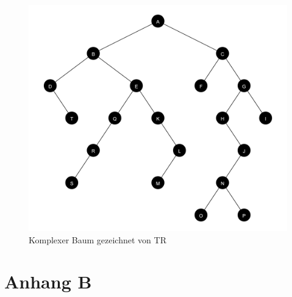 \begin{figure}[ht]
    \centering
    \includegraphics[scale = 0.11]{abbildungen/komplex_a3}
    \caption{Komplexer Baum gezeichnet von TR}
\end{figure}

\chapter{Anhang B}
\label{chap:anhang_b}















